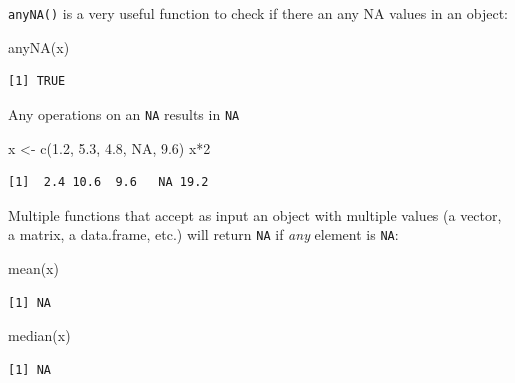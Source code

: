 \documentclass[
]{book}
\newenvironment{Shaded}{\begin{snugshade}}{\end{snugshade}}
\newcommand{\ConstantTok}[1]{\textcolor[rgb]{0.00,0.00,0.00}{#1}}
\newcommand{\DecValTok}[1]{\textcolor[rgb]{0.00,0.00,0.81}{#1}}
\newcommand{\FloatTok}[1]{\textcolor[rgb]{0.00,0.00,0.81}{#1}}
\newcommand{\FunctionTok}[1]{\textcolor[rgb]{0.00,0.00,0.00}{#1}}
\newcommand{\NormalTok}[1]{#1}
\newcommand{\OtherTok}[1]{\textcolor[rgb]{0.56,0.35,0.01}{#1}}
\newcommand{\SpecialCharTok}[1]{\textcolor[rgb]{0.00,0.00,0.00}{#1}}
\begin{document}
\texttt{anyNA()} is a very useful function to check if there an any NA values in an object:

\begin{Shaded}
\begin{Highlighting}[]
\FunctionTok{anyNA}\NormalTok{(x)}
\end{Highlighting}
\end{Shaded}

\begin{verbatim}
[1] TRUE
\end{verbatim}

\begin{rmdnote}
Any operations on an \texttt{NA} results in \texttt{NA}
\end{rmdnote}

\begin{Shaded}
\begin{Highlighting}[]
\NormalTok{x }\OtherTok{\textless{}{-}} \FunctionTok{c}\NormalTok{(}\FloatTok{1.2}\NormalTok{, }\FloatTok{5.3}\NormalTok{, }\FloatTok{4.8}\NormalTok{, }\ConstantTok{NA}\NormalTok{, }\FloatTok{9.6}\NormalTok{)}
\NormalTok{x}\SpecialCharTok{*}\DecValTok{2}
\end{Highlighting}
\end{Shaded}

\begin{verbatim}
[1]  2.4 10.6  9.6   NA 19.2
\end{verbatim}

Multiple functions that accept as input an object with multiple values (a vector, a matrix, a data.frame, etc.) will return \texttt{NA} if \emph{any} element is \texttt{NA}:

\begin{Shaded}
\begin{Highlighting}[]
\FunctionTok{mean}\NormalTok{(x)}
\end{Highlighting}
\end{Shaded}

\begin{verbatim}
[1] NA
\end{verbatim}

\begin{Shaded}
\begin{Highlighting}[]
\FunctionTok{median}\NormalTok{(x)}
\end{Highlighting}
\end{Shaded}

\begin{verbatim}
[1] NA
\end{verbatim}
\end{document}
